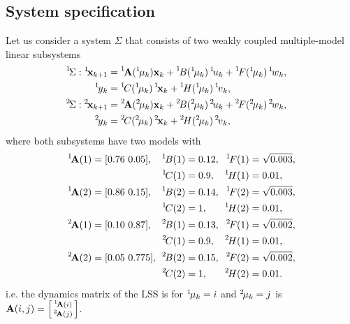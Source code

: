 \documentclass[conference,10pt]{IEEEtran}
\def\ist{\prescript{1\!}{}}
\def\iind{\prescript{2\!}{}}
\begin{document}
\subsection{System specification}
\label{sec:ExampleSystemSpecification}
Let us consider a system $\Sigma$ that consists of two weakly
coupled multiple-model linear subsystems
\begin{subequations}
\begin{align*}
  \hspace{-1em}
  \ist{\Sigma}: \ist{\bfx}_{k+1} &= \ist{\bfA}(\ist{\mu}_{k}) \bfx_{k} +
  \ist{B}(\ist{\mu}_{k})\ist{u}_{k} +
  \ist{F}(\ist{\mu}_{k})\ist{w}_{k},\\
  \ist{y}_k&=\ist{C}(\ist{\mu}_{k})\ist{\bfx}_{k}+\ist{H}(\ist{\mu}_{k})\ist{v}_k,\\
  \hspace{-1em}
  \iind{\Sigma}: \iind{\bfx}_{k+1} &=  \iind{\bfA}(\iind{\mu}_{k}) \bfx_{k} +
  \iind{B}(\iind{\mu}_{k})\iind{u}_{k} +
  \iind{F}(\iind{\mu}_{k})\iind{w}_{k},\\
  \iind{y}_k&=\iind{C}(\iind{\mu}_{k})\iind{\bfx}_{k}+\iind{H}(\iind{\mu}_{k})\iind{v}_k,
\end{align*}
\end{subequations}
where both subsystems have two models with%
\begin{align*}
  \ist{\bfA}(1) & = [0.76\ 0.05], & \!\!\! \ist{B}(1) & = 0.12, & \!\! \ist{F}(1) & = \sqrt{0.003},\\
                &&\!\!\!\ist{C}(1) & = 0.9,  &\!\! \ist{H}(1) & = 0.01,\\
  \ist{\bfA}(2) & = [0.86\ 0.15], & \!\!\! \ist{B}(2) & = 0.14, & \!\! \ist{F}(2) & = \sqrt{0.003},\\
                &&\!\! \ist{C}(2) & = 1,    &\!\! \ist{H}(2) & = 0.01,\\
  \iind{\bfA}(1) & = [0.10\ 0.87], &\! \!\! \iind{B}(1) & = 0.13, & \!\! \iind{F}(1) & = \sqrt{0.002},\\
                 &&\!\!\!  \iind{C}(1) & = 0.9, &\!\! \iind{H}(1) & = 0.01,\\
  \iind{\bfA}(2) & = [0.05\ 0.775], &\!\! \!\! \iind{B}(2) & = 0.15, & \!\!\! \iind{F}(2) & = \sqrt{0.002},\\
                 &&\!\!\!  \iind{C}(2) & = 1,   & \!\! \iind{H}(2) & = 0.01.
\end{align*}
i.e. the dynamics matrix of the LSS is for $\ist{\mu}_k=i$ and  $\iind{\mu}_k=j$ is
$ \bfA(i,j)=\begin{bsmallmatrix}\ist{\bfA}(i)\\\iind{\bfA}(j)\end{bsmallmatrix}$.
\end{document}
